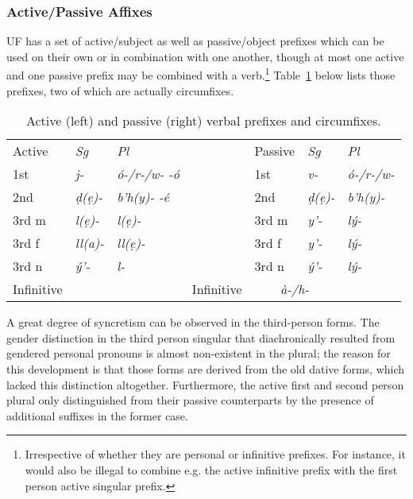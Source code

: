 \documentclass[a4paper, 12pt, oneside, final]{article}
\let \nf \normalfont
\def \d {ḍ}
\def \e {ẹ}
\begin{document}
\subsubsection{Active/Passive Affixes}\label{subsubsec:active-passive-affixes}
UF has a set of active/subject as well as passive/object prefixes which can be used on their own or in combination
with one another, though at most one active and one passive prefix may be combined with a verb.\footnote{Irrespective
of whether they are personal or infinitive prefixes. For instance, it would also be illegal to combine e.g. the active
infinitive prefix with the first person active singular prefix.} Table~\ref{tab:active-passive-prefixes}
below lists those prefixes, two of which are actually circumfixes.

\begin{table}[h]
\centering
\noindent\begin{tabular}{@{}|>{}l|>{\it}l|>{\it}l|>{}l|>{}l|>{\it}l|>{\it}l|}\cline{1-3}\cline{5-7}
 Active&\nf Sg&\nf Pl& & Passive&\nf Sg&\nf Pl\\\cline{1-3}\cline{5-7}
1st&j-&ó-/r-/w- -ó&&1st&v-&ó-/r-/w-\\\cline{1-3}\cline{5-7}
2nd&\d{}(\e)-&b’h(y)- -é&&2nd&\d{}(\e)-&b’h(y)-\\\cline{1-3}\cline{5-7}
3rd m&l(\e)-&l(\e)-&&3rd m&y’-&lý-\\\cline{1-3}\cline{5-7}
3rd f&ll(a)-&ll(\e)-&&3rd f&y’- &lý-\\\cline{1-3}\cline{5-7}
3rd n&ý’- &l-&&3rd n&ý’-&lý-\\\cline{1-3}\cline{5-7}
Infinitive&\multicolumn{2}{c|}{\it d\e-}&&Infinitive&\multicolumn{2}{c|}{\it à-/h-}\\\cline{1-3}\cline{5-7}
\end{tabular}
\caption{Active (left) and passive (right) verbal prefixes and circumfixes.}\label{tab:active-passive-prefixes}
\end{table}

\noindent A great degree of syncretism can be observed in the third-person forms. The gender distinction in the
third person singular that diachronically resulted from gendered personal pronouns is almost non-existent in the
plural; the reason for this development is that those forms are derived from the old dative forms, which lacked
this distinction altogether.
Furthermore, the active first and second person plural only distinguished from their passive counterparts by
the presence of additional suffixes in the former case.
\end{document}
